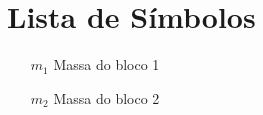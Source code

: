 


\chapter{Lista de Símbolos}


\begin{itemize}
\item[$m_1$] 		Massa do bloco 1
\item[$m_2$] 		Massa do bloco 2
\end{itemize}

